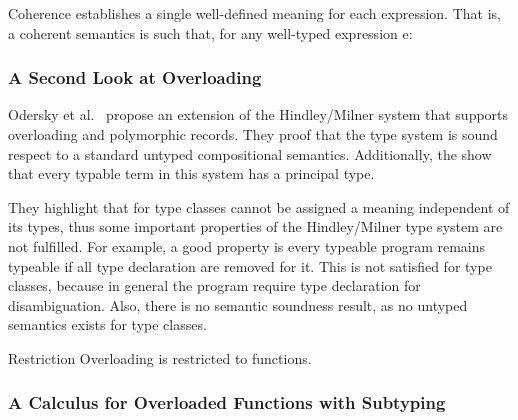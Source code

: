 \documentclass[hidelinks, twocolumn]{article}
\begin{document}
Coherence establishes a single well-defined meaning for each expression. That is, a coherent semantics is such that, for any well-typed expression e:


\subsubsection{A Second Look at Overloading}
Odersky et al.~\cite{Odersky1995} propose an extension of the Hindley/Milner system that supports overloading and polymorphic records. They proof that the type system is sound respect to a standard untyped compositional semantics. Additionally, the show  that every typable term in this system has a principal type.

They highlight that for type classes cannot be assigned a meaning independent of its types, thus some important properties of the Hindley/Milner type system are not fulfilled. For example, a good property is  every typeable program remains typeable if all type declaration are removed for it. This is not satisfied for type classes, because in general the program require type declaration for disambiguation. Also, there is no semantic soundness result, as no untyped semantics exists for type classes.

Restriction 
Overloading is restricted to functions.

\subsubsection{A Calculus for Overloaded Functions with Subtyping}
\end{document}
